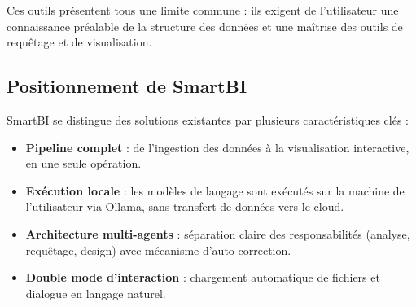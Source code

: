 Ces outils présentent tous une limite commune : ils exigent de l'utilisateur une connaissance préalable de la structure des données et une maîtrise des outils de requêtage et de visualisation.






\subsection{Positionnement de SmartBI}

SmartBI se distingue des solutions existantes par plusieurs caractéristiques clés :

\begin{itemize}[leftmargin=2cm]
    \item \textbf{Pipeline complet} : de l'ingestion des données à la visualisation interactive, en une seule opération.
    \item \textbf{Exécution locale} : les modèles de langage sont exécutés sur la machine de l'utilisateur via Ollama, sans transfert de données vers le cloud.
    \item \textbf{Architecture multi-agents} : séparation claire des responsabilités (analyse, requêtage, design) avec mécanisme d'auto-correction.
    \item \textbf{Double mode d'interaction} : chargement automatique de fichiers et dialogue en langage naturel.
\end{itemize}

